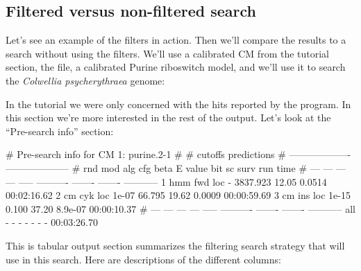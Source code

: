 \subsection{Filtered versus non-filtered search}

Let's see an example of the filters in action. Then we'll compare the
results to a search without using the filters. We'll use a calibrated
CM from the tutorial section, the  file, a
calibrated Purine riboswitch model, and we'll use it to search the
\emph{Colwellia psycherythraea} genome:


In the tutorial we were only concerned with the hits reported by the
program. In this section we're more interested in the rest of the
output. Let's look at the ``Pre-search info'' section:

\begin{sreoutput}
# Pre-search info for CM 1: purine.2-1
#
#                                  cutoffs            predictions     
#                            -------------------  --------------------
# rnd  mod  alg  cfg   beta     E value   bit sc     surv     run time
# ---  ---  ---  ---  -----  ----------  -------  -------  -----------
    1  hmm  fwd  loc      -    3837.923    12.05   0.0514  00:02:16.62
    2   cm  cyk  loc  1e-07      66.795    19.62   0.0009  00:00:59.69
    3   cm  ins  loc  1e-15       0.100    37.20  8.9e-07  00:00:10.37
# ---  ---  ---  ---  -----  ----------  -------  -------  -----------
  all    -    -    -      -           -        -        -  00:03:26.70
\end{sreoutput}

This is tabular output section summarizes the filtering search
strategy that  will use in this search. Here are
descriptions of the different columns:

